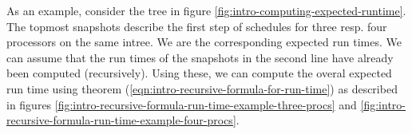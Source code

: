

As an example, consider the tree in figure \ref{fig:intro-computing-expected-runtime}. The topmost snapshots describe the first step of schedules for three resp. four processors on the same intree. We are the corresponding expected run times. We can assume that the run times of the snapshots in the second line have already been computed (recursively). Using these, we can compute the overal expected run time using theorem (\ref{eqn:intro-recursive-formula-for-run-time}) as described in figures \ref{fig:intro-recursive-formula-run-time-example-three-procs} and \ref{fig:intro-recursive-formula-run-time-example-four-procs}. 

